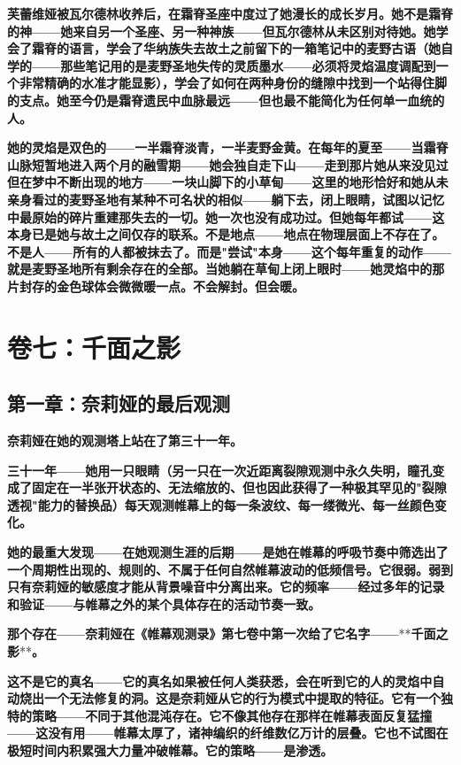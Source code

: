\documentclass[12pt,a4paper,openany]{ctexbook}
\begin{document}
\textbf{芙蕾维娅被瓦尔德林收养后，在霜脊圣座中度过了她漫长的成长岁月。她不是霜脊的神——她来自另一个圣座、另一种神族——但瓦尔德林从未区别对待她。她学会了霜脊的语言，学会了华纳族失去故土之前留下的一箱笔记中的麦野古语（她自学的——那些笔记用的是麦野圣地失传的灵质墨水——必须将灵焰温度调配到一个非常精确的水准才能显影），学会了如何在两种身份的缝隙中找到一个站得住脚的支点。她至今仍是霜脊遗民中血脉最远——但也最不能简化为任何单一血统的人。}


\textbf{她的灵焰是双色的——一半霜脊淡青，一半麦野金黄。在每年的夏至——当霜脊山脉短暂地进入两个月的融雪期——她会独自走下山——走到那片她从来没见过但在梦中不断出现的地方——一块山脚下的小草甸——这里的地形恰好和她从未亲身看过的麦野圣地有某种不可名状的相似——躺下去，闭上眼睛，试图以记忆中最原始的碎片重建那失去的一切。她一次也没有成功过。但她每年都试——这本身已是她与故土之间仅存的联系。不是地点——地点在物理层面上不存在了。不是人——所有的人都被抹去了。而是"尝试"本身——这个每年重复的动作——就是麦野圣地所有剩余存在的全部。当她躺在草甸上闭上眼时——她灵焰中的那片封存的金色球体会微微暖一点。不会解封。但会暖。}


\chapter{卷七：千面之影}


\section*{第一章：奈莉娅的最后观测}


\textbf{奈莉娅在她的观测塔上站在了第三十一年。}


\textbf{三十一年——她用一只眼睛（另一只在一次近距离裂隙观测中永久失明，瞳孔变成了固定在一半张开状态的、无法缩放的、但也因此获得了一种极其罕见的"裂隙透视"能力的替换品）每天观测帷幕上的每一条波纹、每一缕微光、每一丝颜色变化。}


\textbf{她的最重大发现——在她观测生涯的后期——是她在帷幕的呼吸节奏中筛选出了一个周期性出现的、规则的、不属于任何自然帷幕波动的低频信号。它很弱。弱到只有奈莉娅的敏感度才能从背景噪音中分离出来。它的频率——经过多年的记录和验证——与帷幕之外的某个具体存在的活动节奏一致。}


\textbf{那个存在——奈莉娅在《帷幕观测录》第七卷中第一次给了它名字——}**\textbf{千面之影}**\textbf{。}


\textbf{这不是它的真名——它的真名如果被任何人类获悉，会在听到它的人的灵焰中自动烧出一个无法修复的洞。这是奈莉娅从它的行为模式中提取的特征。它有一个独特的策略——不同于其他混沌存在。它不像其他存在那样在帷幕表面反复猛撞——这没有用——帷幕太厚了，诸神编织的纤维数亿万计的层叠。它也不试图在极短时间内积累强大力量冲破帷幕。它的策略——是渗透。}
\end{document}
